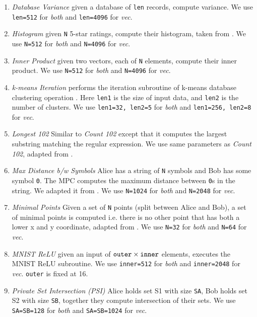 \begin{enumerate}
    \item {\em Database Variance} given a database of {\tt len} records, compute variance.  We use {\tt len=512} for {\em both} and {\tt len=4096} for {\em vec}.
    
    \item {\em Histogram} given {\tt N} 5-star ratings, compute their histogram, taken from \cite{Ishaq:2019, Farzan:2021}. We use {\tt N=512} for {\em both} and {\tt N=4096} for {\em vec}.

    \item {\em Inner Product} given two vectors, each of {\tt N} elements, compute their inner product. We use {\tt N=512} for {\em both} and {\tt N=4096} for {\em vec}.

    \item {\em k-means Iteration} performs the iteration subroutine of k-means database clustering operation \cite{Jagannathan:2005, Vaidya:2003}. Here {\tt len1} is the size of input data, and {\tt len2} is the number of clusters. We use {\tt len1=32, len2=5} for {\em both} and {\tt len1=256, len2=8} for {\em vec}. 
    
    \item {\em Longest 102} Similar to {\em Count 102} except that it computes the largest substring matching the regular expression. We use same parameters as {\em Count 102}, adapted from \cite{Farzan:2021}.
    
    \item {\em Max Distance b/w Symbols} Alice has a string of {\tt N} symbols and Bob has some symbol {\tt 0}. The MPC computes the maximum distance between {\tt 0}s in the string. We adapted it from \cite{Farzan:2021}. We use {\tt N=1024} for {\em both} and {\tt N=2048} for {\em vec}.
    
    \item {\em Minimal Points} Given a set of {\tt N} points (split between Alice and Bob), a set of minimal points is computed i.e. there is no other point that has both a lower x and y coordinate, adapted from \cite{Farzan:2021}. We use {\tt N=32} for {\em both} and {\tt N=64} for {\em vec}.
    
    \item {\em MNIST ReLU} given an input of ${\tt outer}\times{\tt inner}$ elements, executes the MNIST ReLU subroutine. We use {\tt inner=512} for {\em both} and {\tt inner=2048} for {\em vec}. {\tt outer} is fixed at 16. 
    
    \item {\em Private Set Intersection (PSI)} Alice holds set S1 with size {\tt SA}, Bob holds set S2 with size {\tt SB}, together they compute intersection of their sets. We use {\tt SA=SB=128} for {\em both} and {\tt SA=SB=1024} for {\em vec}.
\end{enumerate}

